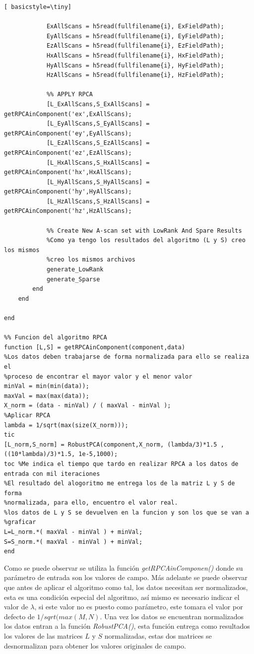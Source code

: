 \begin{lstlisting}[ basicstyle=\tiny]
            
            ExAllScans = h5read(fullfilename{i}, ExFieldPath);
            EyAllScans = h5read(fullfilename{i}, EyFieldPath);
            EzAllScans = h5read(fullfilename{i}, EzFieldPath);
            HxAllScans = h5read(fullfilename{i}, HxFieldPath);
            HyAllScans = h5read(fullfilename{i}, HyFieldPath);
            HzAllScans = h5read(fullfilename{i}, HzFieldPath);
            
            %% APPLY RPCA
            [L_ExAllScans,S_ExAllScans] = getRPCAinComponent('ex',ExAllScans);
            [L_EyAllScans,S_EyAllScans] = getRPCAinComponent('ey',EyAllScans);
            [L_EzAllScans,S_EzAllScans] = getRPCAinComponent('ez',EzAllScans);
            [L_HxAllScans,S_HxAllScans] = getRPCAinComponent('hx',HxAllScans);
            [L_HyAllScans,S_HyAllScans] = getRPCAinComponent('hy',HyAllScans);
            [L_HzAllScans,S_HzAllScans] = getRPCAinComponent('hz',HzAllScans);
            
            %% Create New A-scan set with LowRank And Spare Results
            %Como ya tengo los resultados del algoritmo (L y S) creo los mismos
            %creo los mismos archivos
            generate_LowRank
            generate_Sparse
        end
    end
    
end

%% Funcion del algoritmo RPCA
function [L,S] = getRPCAinComponent(component,data)
%Los datos deben trabajarse de forma normalizada para ello se realiza el
%proceso de encontrar el mayor valor y el menor valor
minVal = min(min(data));
maxVal = max(max(data));
X_norm = (data - minVal) / ( maxVal - minVal );
%Aplicar RPCA
lambda = 1/sqrt(max(size(X_norm)));
tic
[L_norm,S_norm] = RobustPCA(component,X_norm, (lambda/3)*1.5 , ((10*lambda)/3)*1.5, 1e-5,1000);
toc %Me indica el tiempo que tardo en realizar RPCA a los datos de entrada con mil iteraciones
%El resultado del alogoritmo me entrega los de la matriz L y S de forma
%normalizada, para ello, encuentro el valor real.
%los datos de L y S se devuelven en la funcion y son los que se van a
%graficar
L=L_norm.*( maxVal - minVal ) + minVal;
S=S_norm.*( maxVal - minVal ) + minVal;
end
\end{lstlisting}

Como se puede observar se utiliza la función \textit{getRPCAinComponen()} donde su parámetro de entrada son los valores de campo. Más adelante se puede observar que antes de aplicar el algoritmo como tal, los datos necesitan ser normalizados, esta es una condición especial del algoritmo,  así mismo es necesario indicar el valor de $\lambda $, si este valor no es puesto como parámetro, este tomara el valor por defecto de $ 1 / sqrt(max(M,N)$. Una vez los datos se encuentran normalizados los datos entran a la función \textit{RobustPCA()}, esta función entrega como resultados los valores de las matrices $L$ y $S$ normalizadas, estas dos matrices se desnormalizan para obtener los valores originales de campo.


